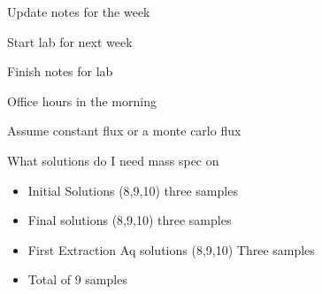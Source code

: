 \documentclass[idxtotoc,hyperref,openany,oneside]{labbook} %
\newcommand{\cmark}{\ding{51}}%
\newcommand{\done}{\rlap{$\square$}{\raisebox{2pt}{\large\hspace{1pt}\cmark}}%
  \hspace{-2.5pt}}
\begin{document}



\begin{todolist}
\item[\done]{Update notes for the week}
\end{todolist}



\begin{todolist}
\item[\done]{Start lab for next week}
\end{todolist}






\begin{todolist}
\item[\done]{Finish notes for lab}
\item[\done]{Office hours in the morning}
\end{todolist}


\begin{todolist}
\item[\done]{Assume constant flux or a monte carlo flux}
\item[\done]{What solutions do I need mass spec on}
  \begin{itemize}
  \item{Initial Solutions (8,9,10) three samples}
  \item{Final solutions (8,9,10) three samples}
  \item{First Extraction Aq solutions (8,9,10) Three samples}
  \item{Total of 9 samples}
  \end{itemize}
\end{todolist}





\end{document}
